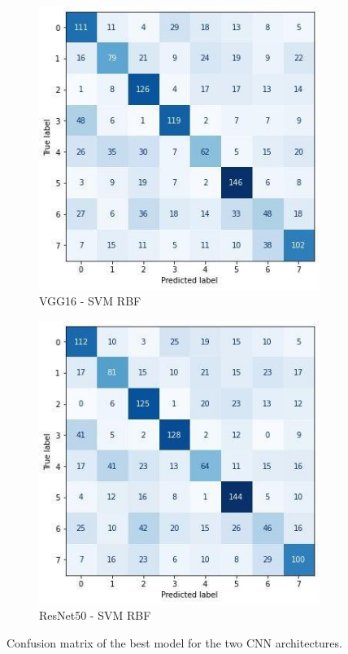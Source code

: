 \begin{figure}[ht]
  \begin{subfigure}[c]{0.475\textwidth}
    \centering
    \includegraphics[width=\textwidth]{images/best_vgg16_svmrbf.jpg}
    \caption{VGG16 - SVM RBF}
    \label{fig:best_vgg16_svmrbf_cm}
  \end{subfigure}
  \hfill
  \begin{subfigure}[c]{0.475\textwidth}
    \centering
    \includegraphics[width=\textwidth]{images/best_resnet50_svmrbf.jpg}
    \caption{ResNet50 - SVM RBF}
    \label{fig:best_resnet50_svmrbf_cm}
  \end{subfigure}
  \caption{Confusion matrix of the best model for the two CNN architectures.}
\end{figure}

